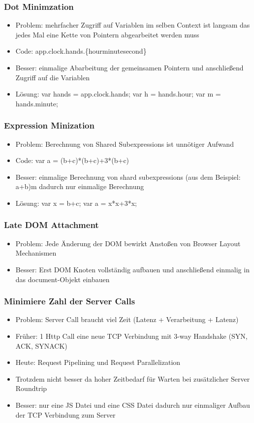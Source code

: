 \documentclass{article} %
\begin{document}
	\subsubsection{Dot Minimzation}
	\begin{itemize}
		\item Problem: mehrfacher Zugriff auf Variablen im selben Context ist langsam das jedes Mal eine Kette von Pointern abgearbeitet werden muss
		\item Code: app.clock.hands.\{hour\textbar minute\textbar second\}
		\item Besser: einmalige Abarbeitung der gemeinsamen Pointern und anschließend Zugriff auf die Variablen
		\item Lösung: var hands = app.clock.hands; var h = hands.hour; var m = hands.minute;
	\end{itemize}
	\subsubsection{Expression Minization}
	\begin{itemize}
		\item Problem: Berechnung von Shared Subexpressions ist unnötiger Aufwand
		\item Code: var a = (b+c)*(b+c)+3*(b+c)
		\item Besser: einmalige Berechnung von shard subexpressions (aus dem Beispiel: a+b)m dadurch nur einmalige Berechnung
		\item Lösung: var x = b+c; var a = x*x+3*x;
	\end{itemize}
	\subsubsection{Late DOM Attachment}
	\begin{itemize}
		\item Problem: Jede Änderung der DOM bewirkt Anstoßen von Browser Layout Mechanismen
		\item Besser: Erst DOM Knoten vollständig aufbauen und anschließend einmalig in das document-Objekt einbauen
	\end{itemize}
	\subsubsection{Minimiere Zahl der Server Calls}
	\begin{itemize}
		\item Problem: Server Call braucht viel Zeit (Latenz + Verarbeitung + Latenz)
		\item Früher: 1 Http Call eine neue TCP Verbindung mit 3-way Handshake (SYN, ACK, SYNACK)
		\item Heute: Request Pipelining und Request Parallelization
		\item Trotzdem nicht besser da hoher Zeitbedarf für Warten bei zusätzlicher Server Roundtrip
		\item Besser: nur eine JS Datei und eine CSS Datei dadurch nur einmaliger Aufbau der TCP Verbindung zum Server
	\end{itemize}
\end{document}
